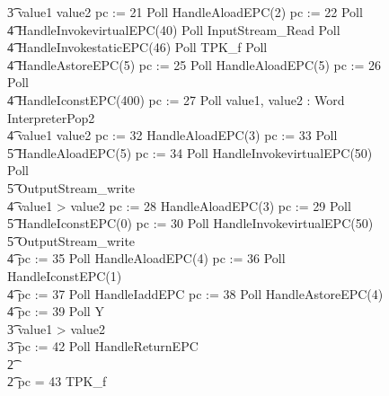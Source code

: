 \begin{figure}[t!]
\begin{circus}
    \t3 \circif value1 \leq value2 \circthen pc := 21 \circseq Poll \circseq HandleAloadEPC(2) \circseq pc := 22 \circseq Poll \circseq \\
    \t4 HandleInvokevirtualEPC(40) \circseq Poll \circseq InputStream\_Read \circseq Poll \circseq \\
    \t4 HandleInvokestaticEPC(46) \circseq Poll \circseq TPK\_f  \circseq Poll \circseq \\
    \t4 HandleAstoreEPC(5) \circseq pc := 25 \circseq Poll \circseq HandleAloadEPC(5) \circseq pc := 26 \circseq Poll \circseq \\
    \t4 HandleIconstEPC(400) \circseq pc := 27 \circseq Poll \circseq \circvar value1, value2 : Word \circspot InterpreterPop2 \circseq \\
    \t4 \circif value1 \leq value2 \circthen pc := 32 \circseq HandleAloadEPC(3) \circseq pc := 33 \circseq Poll \circseq \\
    \t5 HandleAloadEPC(5) \circseq pc := 34 \circseq Poll \circseq HandleInvokevirtualEPC(50) \circseq Poll \circseq \\
    \t5 OutputStream\_write \\
    \t4 {} \circelse value1 > value2 \circthen pc := 28 \circseq HandleAloadEPC(3) \circseq pc := 29 \circseq Poll \circseq \\
    \t5 HandleIconstEPC(0) \circseq pc := 30 \circseq Poll \circseq HandleInvokevirtualEPC(50) \circseq \\
    \t5 OutputStream\_write \\
    \t4 \circfi \circseq pc := 35 \circseq Poll \circseq HandleAloadEPC(4) \circseq pc := 36 \circseq Poll \circseq HandleIconstEPC(1) \circseq \\
    \t4 pc := 37 \circseq Poll \circseq HandleIaddEPC \circseq pc := 38 \circseq Poll \circseq HandleAstoreEPC(4) \circseq \\
    \t4 pc := 39 \circseq Poll \circseq Y \\
    \t3 {} \circelse value1 > value2 \circthen \Skip \\
    \t3 \circfi \circseq pc := 42 \circseq Poll \circseq HandleReturnEPC \\
    \t2 {} \cdots {} \\
    \t2 {} \circelse pc = 43 \circthen TPK\_f \\

\end{circus}
\end{figure}
